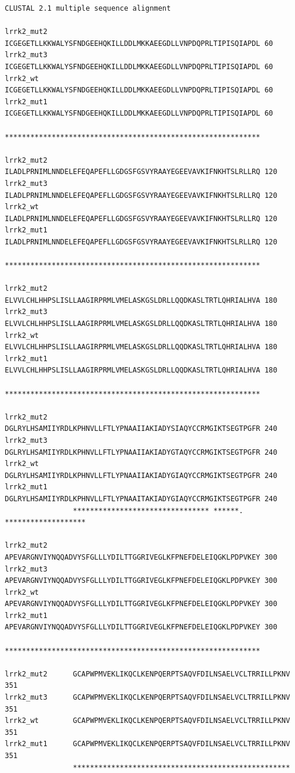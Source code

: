 \documentclass[11pt, a4paper,titlepage]{article}
\begin{document}
\begin{verbatim}
CLUSTAL 2.1 multiple sequence alignment

lrrk2_mut2      ICGEGETLLKKWALYSFNDGEEHQKILLDDLMKKAEEGDLLVNPDQPRLTIPISQIAPDL 60
lrrk2_mut3      ICGEGETLLKKWALYSFNDGEEHQKILLDDLMKKAEEGDLLVNPDQPRLTIPISQIAPDL 60
lrrk2_wt        ICGEGETLLKKWALYSFNDGEEHQKILLDDLMKKAEEGDLLVNPDQPRLTIPISQIAPDL 60
lrrk2_mut1      ICGEGETLLKKWALYSFNDGEEHQKILLDDLMKKAEEGDLLVNPDQPRLTIPISQIAPDL 60
                ************************************************************

lrrk2_mut2      ILADLPRNIMLNNDELEFEQAPEFLLGDGSFGSVYRAAYEGEEVAVKIFNKHTSLRLLRQ 120
lrrk2_mut3      ILADLPRNIMLNNDELEFEQAPEFLLGDGSFGSVYRAAYEGEEVAVKIFNKHTSLRLLRQ 120
lrrk2_wt        ILADLPRNIMLNNDELEFEQAPEFLLGDGSFGSVYRAAYEGEEVAVKIFNKHTSLRLLRQ 120
lrrk2_mut1      ILADLPRNIMLNNDELEFEQAPEFLLGDGSFGSVYRAAYEGEEVAVKIFNKHTSLRLLRQ 120
                ************************************************************

lrrk2_mut2      ELVVLCHLHHPSLISLLAAGIRPRMLVMELASKGSLDRLLQQDKASLTRTLQHRIALHVA 180
lrrk2_mut3      ELVVLCHLHHPSLISLLAAGIRPRMLVMELASKGSLDRLLQQDKASLTRTLQHRIALHVA 180
lrrk2_wt        ELVVLCHLHHPSLISLLAAGIRPRMLVMELASKGSLDRLLQQDKASLTRTLQHRIALHVA 180
lrrk2_mut1      ELVVLCHLHHPSLISLLAAGIRPRMLVMELASKGSLDRLLQQDKASLTRTLQHRIALHVA 180
                ************************************************************

lrrk2_mut2      DGLRYLHSAMIIYRDLKPHNVLLFTLYPNAAIIAKIADYSIAQYCCRMGIKTSEGTPGFR 240
lrrk2_mut3      DGLRYLHSAMIIYRDLKPHNVLLFTLYPNAAIIAKIADYGTAQYCCRMGIKTSEGTPGFR 240
lrrk2_wt        DGLRYLHSAMIIYRDLKPHNVLLFTLYPNAAIIAKIADYGIAQYCCRMGIKTSEGTPGFR 240
lrrk2_mut1      DGLRYLHSAMIIYRDLKPHNVLLFTLYPNAAITAKIADYGIAQYCCRMGIKTSEGTPGFR 240
                ******************************** ******. *******************

lrrk2_mut2      APEVARGNVIYNQQADVYSFGLLLYDILTTGGRIVEGLKFPNEFDELEIQGKLPDPVKEY 300
lrrk2_mut3      APEVARGNVIYNQQADVYSFGLLLYDILTTGGRIVEGLKFPNEFDELEIQGKLPDPVKEY 300
lrrk2_wt        APEVARGNVIYNQQADVYSFGLLLYDILTTGGRIVEGLKFPNEFDELEIQGKLPDPVKEY 300
lrrk2_mut1      APEVARGNVIYNQQADVYSFGLLLYDILTTGGRIVEGLKFPNEFDELEIQGKLPDPVKEY 300
                ************************************************************

lrrk2_mut2      GCAPWPMVEKLIKQCLKENPQERPTSAQVFDILNSAELVCLTRRILLPKNV 351
lrrk2_mut3      GCAPWPMVEKLIKQCLKENPQERPTSAQVFDILNSAELVCLTRRILLPKNV 351
lrrk2_wt        GCAPWPMVEKLIKQCLKENPQERPTSAQVFDILNSAELVCLTRRILLPKNV 351
lrrk2_mut1      GCAPWPMVEKLIKQCLKENPQERPTSAQVFDILNSAELVCLTRRILLPKNV 351
                ***************************************************
\end{verbatim}
\end{document}
